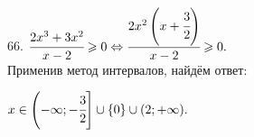 66. $\cfrac{2x^3+3x^2}{x-2}\geqslant0\Leftrightarrow\cfrac{2x^2\left(x+\cfrac{3}{2}\right)}{x-2}\geqslant0.$\\ Применив метод интервалов, найдём ответ:
\begin{figure}[ht!]
\end{figure}
$x\in\left(-\infty;-\cfrac{3}{2}\right]\cup\{0\}\cup(2;+\infty).$\\
